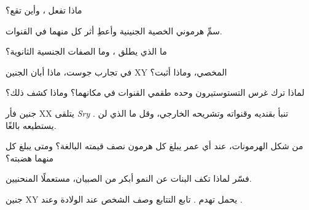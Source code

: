 \begin{exercise}[$\star$]\label{exo:g11:becoming-male-female:3}
ماذا تفعل ، وأين تقع؟
\end{exercise}

\begin{exercise}[$\star$]\label{exo:g11:becoming-male-female:4}
سمِّ هرموني الخصية الجنينية وأعطِ أثر كل منهما في القنوات.
\end{exercise}

\begin{exercise}[$\star$]\label{exo:g11:becoming-male-female:5}
ما الذي يطلق ، وما الصفات الجنسية الثانوية؟
\end{exercise}

\begin{exercise}[$\star\star$]\label{exo:g11:becoming-male-female:6}
في تجارب جوست، ماذا أبان الجنين XY المخصي، وماذا أثبت؟
\end{exercise}

\begin{exercise}[$\star\star$]\label{exo:g11:becoming-male-female:7}
لماذا ترك غرس التستوستيرون وحده طقمي القنوات في مكانهما؟ وماذا كشف
ذلك؟
\end{exercise}

\begin{exercise}[$\star\star$]\label{exo:g11:becoming-male-female:8}
جنين فأر XX يتلقى  \emph{Sry} . تنبأ بقنديه
وقنواته وتشريحه الخارجي، وقل ما الذي لن يستطيعه بالغًا.
\end{exercise}

\begin{exercise}[$\star\star$]\label{exo:g11:becoming-male-female:9}
من شكل الهرمونات، عند أي عمر يبلغ كل هرمون نصف قيمته البالغة؟ ومتى
يبلغ كل منهما هضبته؟
\end{exercise}

\begin{exercise}[$\star\star$]\label{exo:g11:becoming-male-female:10}
فسّر لماذا تكف البنات عن النمو أبكر من الصبيان، مستعملًا المنحنيين.
\end{exercise}

\begin{exercise}[$\star\star$]\label{exo:g11:becoming-male-female:11}
جنين XY يحمل  تهدم  . تابع التتابع وصف الشخص عند الولادة
وعند .
\end{exercise}

